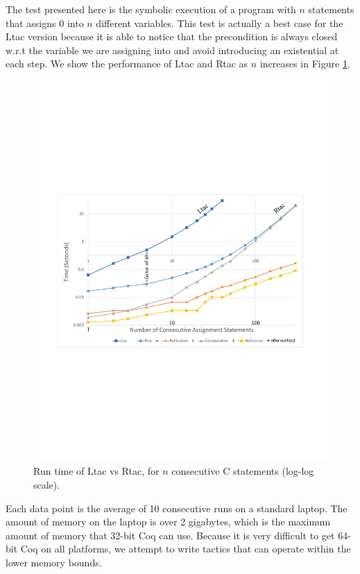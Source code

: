 \documentclass{puthesis}
\begin{document}
The test presented here is the symbolic execution of a program with
$n$ statements that assigns $0$ into $n$ different variables. This
test is actually a best case for the Ltac version because it is able
to notice that the precondition is always closed w.r.t the variable we
are assigning into and avoid introducing an existential at each
step. 
We show the performance of Ltac and
Rtac as $n$ increases in Figure \ref{fig:chart}.

\begin{figure}
\vspace{-2ex}
\includegraphics[width=\textwidth]{chart.pdf}
\vspace{-4ex}
\caption{Run time of Ltac vs Rtac, for $n$ consecutive C statements (log-log scale).}
\label{fig:chart}
\vspace{-4ex}
\end{figure}

Each data point is the average of 10 consecutive runs on a standard laptop. The
amount of memory on the laptop is over 2 gigabytes, which is the
maximum amount of memory that 32-bit Coq can use. Because it is very
difficult to get 64-bit Coq on all platforms, we attempt to write
tactics that can operate within the lower memory bounds.
\end{document}
